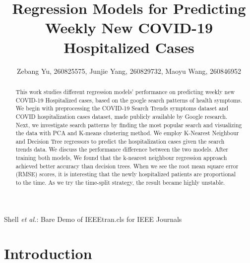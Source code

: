 \documentclass[journal,11pt]{IEEEtran}
\begin{document}
\title{Regression Models for Predicting Weekly New COVID-19 Hospitalized Cases}

\author{Zebang Yu, 260825575,
        Junjie Yang, 260829732,
        Maoyu Wang, 260846952
        }%
{Shell \MakeLowercase{\textit{et al.}}: Bare Demo of IEEEtran.cls for IEEE Journals}

\maketitle

\begin{abstract}
This work studies different regression models' performance on predicting weekly new COVID-19 Hospitalized cases, based on the google search patterns of health symptoms. We begin with preprocessing the COVID-19 Search Trends symptoms dataset and COVID hospitalization cases dataset, made publicly available by Google research. Next, we investigate search patterns by finding the most popular search and visualizing the data with PCA and K-means clustering method. We employ K-Nearest Neighbour and Decision Tree regressors to predict the hospitalization cases given the search trends data. We discuss the performance difference between the two models. After training both models, We found that the k-nearest neighbour regression approach achieved better accuracy than decision trees. When we see the root mean square error (RMSE) scores, it is interesting that the newly hospitalized patients are proportional to the time. As we try the time-split strategy, the result became highly unstable.

\end{abstract}


\section{Introduction}
\end{document}
